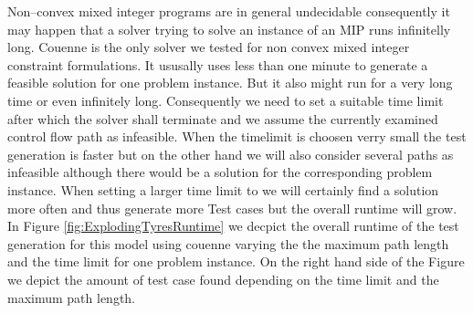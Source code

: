 Non--convex mixed integer programs are in general undecidable consequently it may happen that a solver trying to solve an instance of an MIP runs infinitelly long. Couenne is the only solver we tested for non convex mixed integer constraint formulations. It ususally uses less than one minute to generate a feasible solution for one problem instance. But it also might run for a very long time or even infinitely long. Consequently we need to set a suitable time limit after which the solver shall terminate and we assume the currently examined control flow path as infeasible. When the timelimit is choosen verry small the test generation is faster but on the other hand we will also consider several paths as infeasible although there would be a solution for the corresponding problem instance. When setting a larger time limit to we will certainly find a solution more often and thus generate more Test cases but the overall runtime will grow. In Figure \ref{fig:ExplodingTyresRuntime} we decpict the overall runtime of the test generation for this model using couenne varying the the maximum path length and the time limit for one problem instance. On the right hand side of the Figure we depict the amount of test case found depending on the time limit and the maximum path length.

